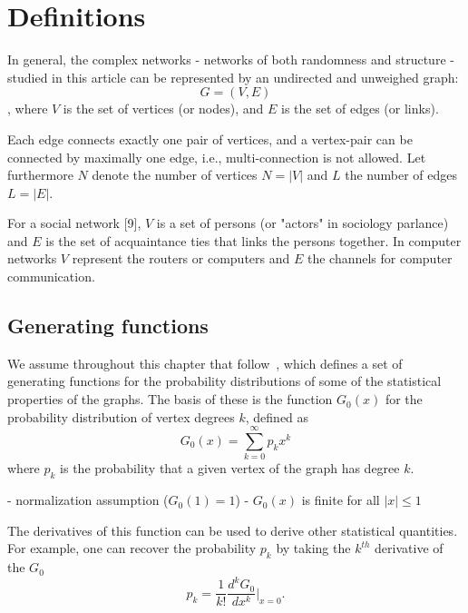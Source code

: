 \chapter{Definitions}

In general, the complex networks - networks of both randomness and structure - studied in this article can be represented by an undirected and unweighed graph:
\begin{equation}
G = (V,E)	
\end{equation}
, where $V$ is the set of vertices (or nodes), and $E$ is the set of edges (or links).

Each edge connects exactly one pair of vertices, and a vertex-pair can be connected by maximally one edge, i.e., multi-connection is not allowed.
Let furthermore $N$ denote the number of vertices $N = |V|$ and $L$ the number of edges $L = |E|$.

For a social network [9], $V$ is a set of persons (or "actors" in sociology parlance) and $E$ is the set of acquaintance ties that links the persons together.
In computer networks $V$ represent the routers or computers and $E$ the channels for computer communication.






\section{Generating functions}

We assume throughout this chapter that  follow~\cite{Newman:zFi032Kd}, which defines a set of generating functions for the probability distributions of some of the statistical properties of the graphs.
The basis of these is the function $G_0(x)$ for the probability distribution of vertex degrees $k$, defined as
\begin{equation}
G_0(x) = \sum_{k=0}^{\infty} p_k x^k
\end{equation}
where $p_k$ is the probability that a given vertex of the graph has degree $k$.

- normalization assumption ($G_0(1) = 1$)
- $G_0(x)$ is finite for all $|x| \le 1$

The derivatives of this function can be used to derive other statistical quantities.
For example, one can recover the probability $p_k$ by taking the $k^{th}$ derivative of the $G_0$
\begin{equation}
	p_k = \frac{1}{k!} \frac{d^k G_0}{dx^k} \Big|_{x=0}.
\end{equation}

